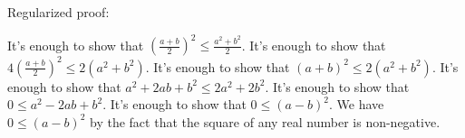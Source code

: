 \documentclass{article}
\begin{document}
Regularized proof:
\begin{tcolorbox}[colback=red!10, width=\linewidth]
It's enough to show that $\left(\frac{a+b}{2}\right)^2 \leq \frac{a^2+b^2}{2}$.
It's enough to show that $4\left(\frac{a+b}{2}\right)^2 \leq 2(a^2+b^2)$.
It's enough to show that $(a+b)^2 \leq 2(a^2+b^2)$.
It's enough to show that $a^2+2ab+b^2 \leq 2a^2+2b^2$.
It's enough to show that $0 \leq a^2-2ab+b^2$.
It's enough to show that $0 \leq (a-b)^2$.
We have $0 \leq (a-b)^2$ by the fact that the square of any real number is non-negative.
\end{tcolorbox}
\end{document}

